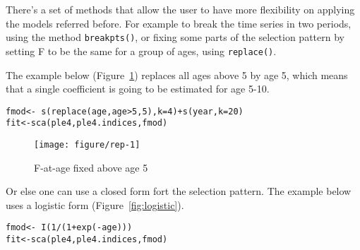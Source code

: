 \documentclass[a4paper,english,10pt]{article}\usepackage[]{graphicx}\usepackage[]{color}
\makeatletter
\def\maxwidth{ %
  \ifdim\Gin@nat@width>\linewidth
    \linewidth
  \else
    \Gin@nat@width
  \fi
}
\newcommand{\hlnum}[1]{\textcolor[rgb]{0.2,0.2,0.2}{#1}}%
\newcommand{\hlopt}[1]{\textcolor[rgb]{0.2,0.2,0.2}{#1}}%
\newcommand{\hlstd}[1]{\textcolor[rgb]{0,0,0}{#1}}%
\newcommand{\hlkwb}[1]{\textcolor[rgb]{0.361,0.506,0.596}{#1}}%
\newcommand{\hlkwc}[1]{\textcolor[rgb]{0.361,0.506,0.596}{#1}}%
\newcommand{\hlkwd}[1]{\textcolor[rgb]{0.361,0.506,0.596}{#1}}%
\newenvironment{kframe}{%
 \def\at@end@of@kframe{}%
 \ifinner\ifhmode%
  \def\at@end@of@kframe{\end{minipage}}%
  \begin{minipage}{\columnwidth}%
 \fi\fi%
 \def\FrameCommand##1{\hskip\@totalleftmargin \hskip-\fboxsep
 \colorbox{shadecolor}{##1}\hskip-\fboxsep
     \hskip-\linewidth \hskip-\@totalleftmargin \hskip\columnwidth}%
 \MakeFramed {\advance\hsize-\width
   \@totalleftmargin\z@ \linewidth\hsize
   \@setminipage}}%
 {\par\unskip\endMakeFramed%
 \at@end@of@kframe}
\newenvironment{knitrout}{}{} %
\newcommand{\code}[1]{{\texttt{#1}}}
\makeatother
\begin{document}
There's a set of methods that allow the user to have more flexibility on applying the models referred before. For example to break the time series in two periods, using the method \code{breakpts()}, or fixing some parts of the selection pattern by setting F to be the same for a group of ages, using \code{replace()}.

The example below (Figure~\ref{fig:rep}) replaces all ages above 5 by age 5, which means that a single coefficient is going to be estimated for age 5-10.

\begin{knitrout}
\color{fgcolor}\begin{kframe}
\begin{alltt}
\hlstd{fmod} \hlkwb{<-} \hlopt{~} \hlkwd{s}\hlstd{(}\hlkwd{replace}\hlstd{(age, age}\hlopt{>}\hlnum{5}\hlstd{,} \hlnum{5}\hlstd{),} \hlkwc{k}\hlstd{=}\hlnum{4}\hlstd{)} \hlopt{+} \hlkwd{s}\hlstd{(year,} \hlkwc{k}\hlstd{=}\hlnum{20}\hlstd{)}
\hlstd{fit} \hlkwb{<-} \hlkwd{sca}\hlstd{(ple4, ple4.indices, fmod)}
\end{alltt}
\end{kframe}
\end{knitrout}

\begin{knitrout}
\color{fgcolor}\begin{figure}[H]

{\centering \texttt{[image: figure/rep-1]} 

}

\caption[F-at-age fixed above age 5]{F-at-age fixed above age 5}\label{fig:rep}
\end{figure}


\end{knitrout}

Or else one can use a closed form fort the selection pattern. The example below uses a logistic form (Figure~\ref{fig:logistic}).

\begin{knitrout}
\color{fgcolor}\begin{kframe}
\begin{alltt}
\hlstd{fmod} \hlkwb{<-} \hlopt{~} \hlkwd{I}\hlstd{(}\hlnum{1}\hlopt{/}\hlstd{(}\hlnum{1}\hlopt{+}\hlkwd{exp}\hlstd{(}\hlopt{-}\hlstd{age)))}
\hlstd{fit} \hlkwb{<-} \hlkwd{sca}\hlstd{(ple4, ple4.indices, fmod)}
\end{alltt}
\end{kframe}
\end{knitrout}
\end{document}
